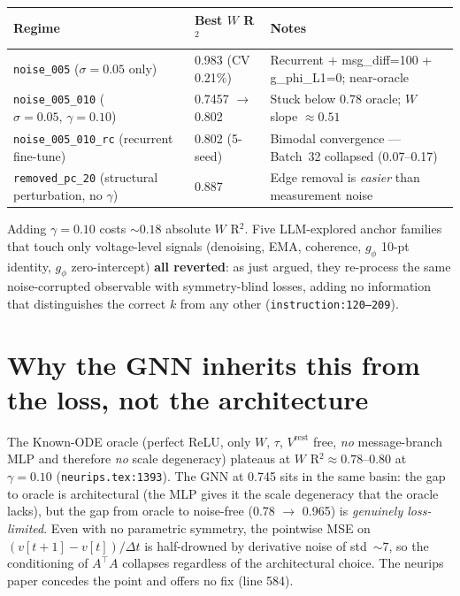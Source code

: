 \documentclass[11pt]{article}
\begin{document}
\begin{table}[h]
\centering
\small
\begin{tabular}{lll}
\toprule
\textbf{Regime} & \textbf{Best $W$ R$^2$} & \textbf{Notes} \\
\midrule
\texttt{noise\_005} ($\sigma=0.05$ only)
  & 0.983 (CV 0.21\%)
  & Recurrent + msg\_diff=100 + g\_phi\_L1=0; near-oracle \\
\texttt{noise\_005\_010} ($\sigma=0.05,\, \gamma=0.10$)
  & 0.7457 $\rightarrow$ 0.802
  & Stuck below 0.78 oracle; $W$ slope $\approx 0.51$ \\
\texttt{noise\_005\_010\_rc} (recurrent fine-tune)
  & 0.802 (5-seed)
  & Bimodal convergence --- Batch~32 collapsed (0.07--0.17) \\
\texttt{removed\_pc\_20} (structural perturbation, no $\gamma$)
  & 0.887
  & Edge removal is \emph{easier} than measurement noise \\
\bottomrule
\end{tabular}
\end{table}

Adding $\gamma=0.10$ costs $\sim 0.18$ absolute $W$ R$^2$. Five LLM-explored
anchor families that touch only voltage-level signals (denoising, EMA,
coherence, $g_\phi$ 10-pt identity, $g_\phi$ zero-intercept) \textbf{all
reverted}: as just argued, they re-process the same noise-corrupted observable
with symmetry-blind losses, adding no information that distinguishes the
correct $k$ from any other (\texttt{instruction:120--209}).

\section{Why the GNN inherits this from the loss, not the architecture}

The Known-ODE oracle (perfect ReLU, only $W$, $\tau$, $V^{\text{rest}}$ free,
\emph{no} message-branch MLP and therefore \emph{no} scale degeneracy)
plateaus at $W$ R$^2 \approx 0.78$--$0.80$ at $\gamma=0.10$
(\texttt{neurips.tex:1393}). The GNN at 0.745 sits in the same basin: the
gap to oracle is architectural (the MLP gives it the scale degeneracy that
the oracle lacks), but the gap from oracle to noise-free
(0.78 $\rightarrow$ 0.965) is \emph{genuinely loss-limited}. Even with no
parametric symmetry, the pointwise MSE on $(v[t{+}1]-v[t])/\Delta t$ is
half-drowned by derivative noise of std~$\sim 7$, so the conditioning of
$A^\top A$ collapses regardless of the architectural choice. The neurips
paper concedes the point and offers no fix (line 584).
\end{document}
